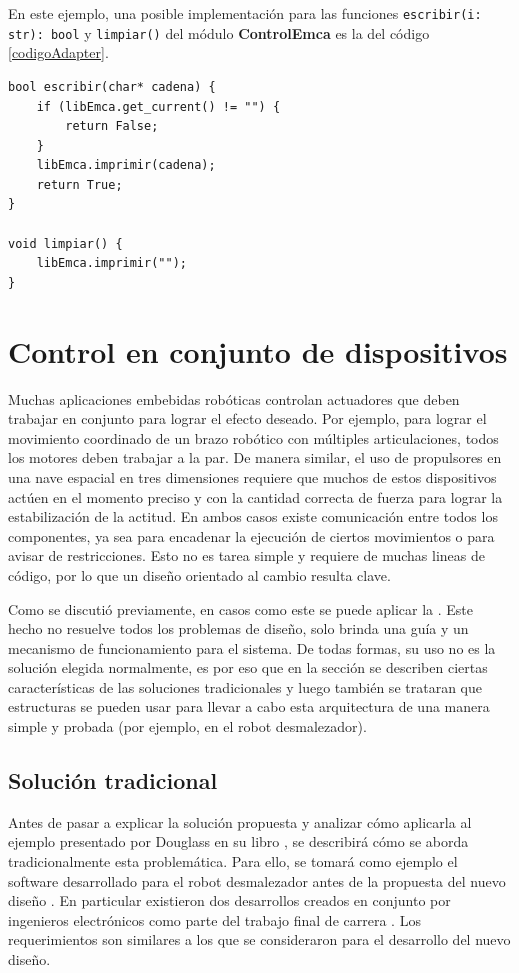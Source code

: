 En este ejemplo, una posible implementación para las funciones \verb|escribir(i: str): bool| y \verb|limpiar()| del módulo \textbf{ControlEmca} es la del código \ref{codigoAdapter}.

\begin{lstlisting}[label={codigoAdapter}, caption=Ejemplo implementación módulo ControlEmca.]
bool escribir(char* cadena) {
    if (libEmca.get_current() != "") {
        return False;
    }
    libEmca.imprimir(cadena);
    return True;
}

void limpiar() {
    libEmca.imprimir("");
}
\end{lstlisting}


\section{Control en conjunto de dispositivos}
Muchas aplicaciones embebidas robóticas controlan \gls{actuadores} que deben trabajar en conjunto para lograr el efecto deseado. Por ejemplo, para lograr el movimiento coordinado de un brazo robótico con múltiples articulaciones, todos los motores deben trabajar a la par. De manera similar, el uso de propulsores en una nave espacial en tres dimensiones requiere que muchos de estos dispositivos actúen en el momento preciso y con la cantidad correcta de fuerza para lograr la estabilización de la actitud. En ambos casos existe comunicación entre todos los componentes, ya sea para encadenar la ejecución de ciertos movimientos o para avisar de restricciones. Esto no es tarea simple y requiere de muchas lineas de código, por lo que un diseño orientado al cambio resulta clave.

Como se discutió previamente, en casos como este se puede aplicar la . Este hecho no resuelve todos los problemas de diseño, solo brinda una guía y un mecanismo de funcionamiento para el sistema. De todas formas, su uso no es la solución elegida normalmente, es por eso que en la sección se describen ciertas características de las soluciones tradicionales y luego también se trataran que estructuras se pueden usar para llevar a cabo esta arquitectura de una manera simple y probada (por ejemplo, en el robot desmalezador).

\subsection*{Solución tradicional}

Antes de pasar a explicar la solución propuesta y analizar cómo aplicarla al ejemplo presentado por Douglass en su libro \cite{douglass}, se describirá cómo se aborda tradicionalmente esta problemática. Para ello, se tomará como ejemplo el software desarrollado para el robot desmalezador antes de la propuesta del nuevo diseño \cite{paperPomponio}. En particular existieron dos desarrollos creados en conjunto por ingenieros electrónicos como parte del trabajo final de carrera \cite{disenioViejo1, disenioViejo2}. Los requerimientos son similares a los que se consideraron para el desarrollo del nuevo diseño.

